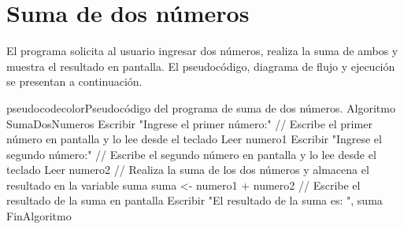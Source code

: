 \documentclass[
	spanish, %
	letterpaper, oneside
]{article}
\begin{document}

\inserttitle


\begin{abstract}
	
	Se realizan 7 programas en PSEINT, cada uno con su respectivo pseudocódigo, diagrama de flujo y ejecución. Los programas son los siguientes:
	\begin{enumerate}
		\item Suma de dos números.
		\item Operaciones básicas (suma, resta, multiplicación, división).
		\item Energía potencial en caída libre ($E_{pot} = mgh$).
		\item Volumen de una esfera ($V = \frac{4}{3}\pi r^3$).
		\item Generación de recibo de luz.
		\item Conversión de acres a hectáreas.
		\item Conversión de pies y libras a metros y kilogramos.
	\end{enumerate}

\end{abstract}


\section{Suma de dos números}

El programa solicita al usuario ingresar dos números, realiza la suma de ambos y muestra el resultado en pantalla. El pseudocódigo, diagrama de flujo y ejecución se presentan a continuación.		
	
\begin{sourcecode}{pseudocodecolor}{Pseudocódigo del programa de suma de dos números.}
Algoritmo SumaDosNumeros
    Escribir "Ingrese el primer número:"
    // Escribe el primer número en pantalla y lo lee desde el teclado
    Leer numero1
    Escribir "Ingrese el segundo número:"
    // Escribe el segundo número en pantalla y lo lee desde el teclado
    Leer numero2
    // Realiza la suma de los dos números y almacena el resultado en la variable suma
    suma <- numero1 + numero2
    // Escribe el resultado de la suma en pantalla
    Escribir "El resultado de la suma es: ", suma
FinAlgoritmo
\end{sourcecode}
\end{document}
